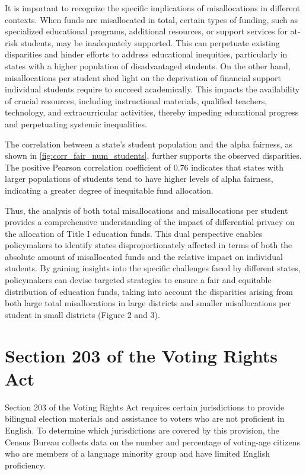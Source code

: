 \documentclass[9pt,lineno,twocolumn,twoside]{pnas-new}
\begin{document}
    It is important to recognize the specific implications of misallocations in different contexts. When funds are misallocated in total, certain types of funding, such as specialized educational programs, additional resources, or support services for at-risk students, may be inadequately supported. This can perpetuate existing disparities and hinder efforts to address educational inequities, particularly in states with a higher population of disadvantaged students. On the other hand, misallocations per student shed light on the deprivation of financial support individual students require to succeed academically. This impacts the availability of crucial resources, including instructional materials, qualified teachers, technology, and extracurricular activities, thereby impeding educational progress and perpetuating systemic inequalities.

    The correlation between a state's student population and the alpha fairness, as shown in \ref{fig:corr_fair_num_students}, further supports the observed disparities. The positive Pearson correlation coefficient of 0.76 indicates that states with larger populations of students tend to have higher levels of alpha fairness, indicating a greater degree of inequitable fund allocation.

    Thus, the analysis of both total misallocations and misallocations per student provides a comprehensive understanding of the impact of differential privacy on the allocation of Title I education funds. This dual perspective enables policymakers to identify states disproportionately affected in terms of both the absolute amount of misallocated funds and the relative impact on individual students. By gaining insights into the specific challenges faced by different states, policymakers can devise targeted strategies to ensure a fair and equitable distribution of education funds, taking into account the disparities arising from both large total misallocations in large districts and smaller misallocations per student in small districts (Figure 2 and 3).

    \section*{Section 203 of the Voting Rights Act}
    Section 203 of the Voting Rights Act requires certain jurisdictions to provide bilingual election materials and assistance to voters who are not proficient in English. To determine which jurisdictions are covered by this provision, the Census Bureau collects data on the number and percentage of voting-age citizens who are members of a language minority group and have limited English proficiency.
\end{document}
